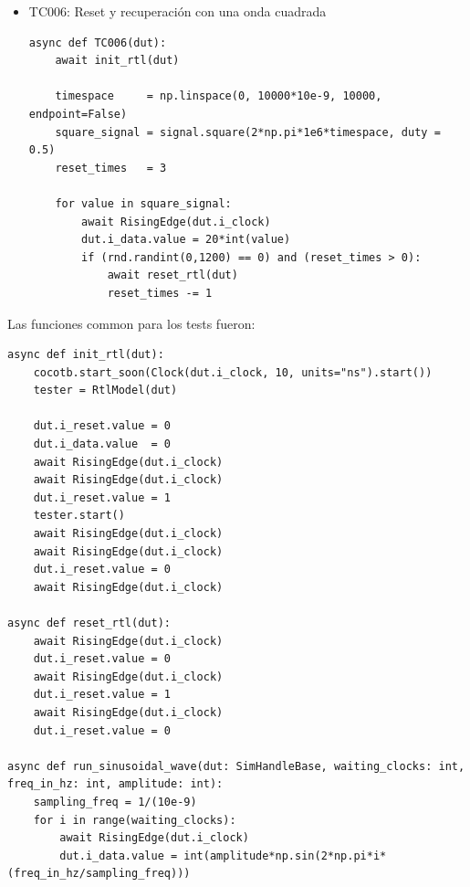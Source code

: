 \begin{itemize}
    \item TC006: Reset y recuperación con una onda cuadrada
        \begin{verbatim}
async def TC006(dut):
    await init_rtl(dut)

    timespace     = np.linspace(0, 10000*10e-9, 10000, endpoint=False)
    square_signal = signal.square(2*np.pi*1e6*timespace, duty = 0.5)
    reset_times   = 3

    for value in square_signal:
        await RisingEdge(dut.i_clock)
        dut.i_data.value = 20*int(value)
        if (rnd.randint(0,1200) == 0) and (reset_times > 0):
            await reset_rtl(dut)
            reset_times -= 1
        \end{verbatim}
\end{itemize}

Las funciones common para los tests fueron:
\begin{verbatim}
async def init_rtl(dut):
    cocotb.start_soon(Clock(dut.i_clock, 10, units="ns").start())
    tester = RtlModel(dut)

    dut.i_reset.value = 0
    dut.i_data.value  = 0
    await RisingEdge(dut.i_clock)
    await RisingEdge(dut.i_clock)
    dut.i_reset.value = 1
    tester.start()
    await RisingEdge(dut.i_clock)
    await RisingEdge(dut.i_clock)
    dut.i_reset.value = 0
    await RisingEdge(dut.i_clock)

async def reset_rtl(dut):
    await RisingEdge(dut.i_clock)
    dut.i_reset.value = 0
    await RisingEdge(dut.i_clock)
    dut.i_reset.value = 1
    await RisingEdge(dut.i_clock)
    dut.i_reset.value = 0

async def run_sinusoidal_wave(dut: SimHandleBase, waiting_clocks: int, freq_in_hz: int, amplitude: int):
    sampling_freq = 1/(10e-9)
    for i in range(waiting_clocks):
        await RisingEdge(dut.i_clock)
        dut.i_data.value = int(amplitude*np.sin(2*np.pi*i*(freq_in_hz/sampling_freq)))

\end{verbatim}

